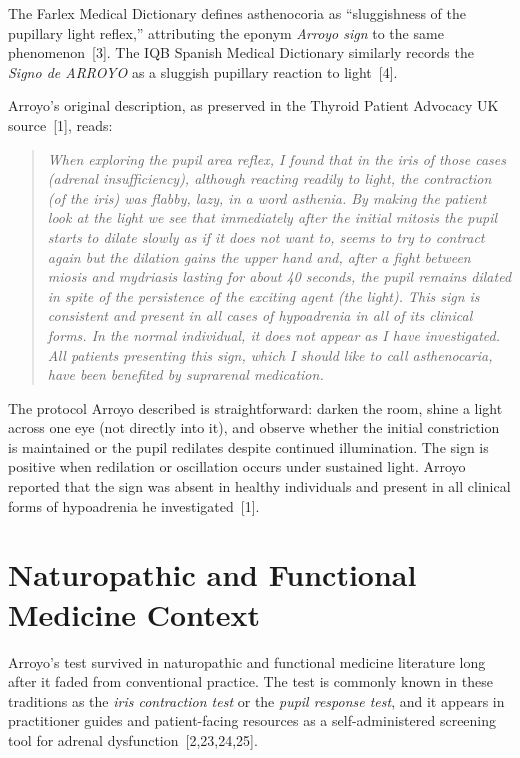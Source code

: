 \documentclass[11pt]{article}
\begin{document}
The Farlex Medical Dictionary defines asthenocoria as ``sluggishness of the
pupillary light reflex,'' attributing the eponym \textit{Arroyo sign} to the
same phenomenon~[3]. The IQB Spanish Medical Dictionary similarly records the
\textit{Signo de ARROYO} as a sluggish pupillary reaction to light~[4].

Arroyo's original description, as preserved in the Thyroid Patient Advocacy UK
source~[1], reads:

\begin{quote}
\small\itshape
When exploring the pupil area reflex, I found that in the iris of those cases
(adrenal insufficiency), although reacting readily to light, the contraction
(of the iris) was flabby, lazy, in a word asthenia. By making the patient look
at the light we see that immediately after the initial mitosis the pupil
starts to dilate slowly as if it does not want to, seems to try to contract
again but the dilation gains the upper hand and, after a fight between miosis
and mydriasis lasting for about 40 seconds, the pupil remains dilated in spite
of the persistence of the exciting agent (the light). This sign is consistent
and present in all cases of hypoadrenia in all of its clinical forms. In the
normal individual, it does not appear as I have investigated. All patients
presenting this sign, which I should like to call asthenocaria, have been
benefited by suprarenal medication.
\end{quote}

The protocol Arroyo described is straightforward: darken the room, shine a
light across one eye (not directly into it), and observe whether the initial
constriction is maintained or the pupil redilates despite continued
illumination. The sign is positive when redilation or oscillation occurs
under sustained light. Arroyo reported that the sign was absent in healthy
individuals and present in all clinical forms of hypoadrenia he
investigated~[1].

\section{Naturopathic and Functional Medicine Context}

Arroyo's test survived in naturopathic and functional medicine literature long
after it faded from conventional practice. The test is commonly known in
these traditions as the \textit{iris contraction test} or the \textit{pupil
response test}, and it appears in practitioner guides and patient-facing
resources as a self-administered screening tool for adrenal
dysfunction~[2,23,24,25].
\end{document}
